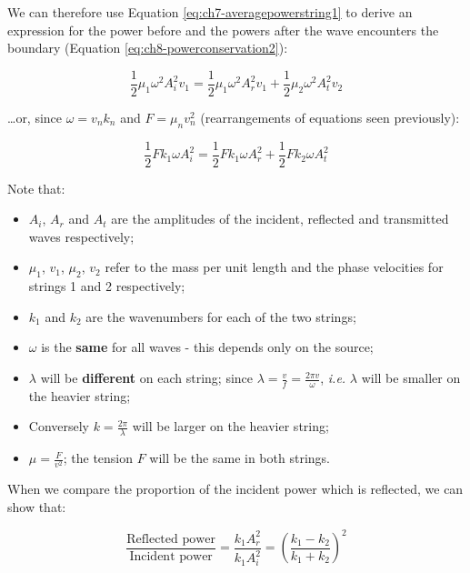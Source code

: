 \documentclass[
]{book}
\providecommand{\tightlist}{%
  \setlength{\itemsep}{0pt}\setlength{\parskip}{0pt}}
\begin{document}
We can therefore use Equation \eqref{eq:ch7-averagepowerstring1} to derive an expression for the power before and the powers after the wave encounters the boundary (Equation \eqref{eq:ch8-powerconservation2}):

\begin{equation}
\frac{1}{2}\mu_1 \omega^2 A_i^2 v_1 = \frac{1}{2}\mu_1 \omega^2 A_r^2 v_1 + \frac{1}{2}\mu_2 \omega^2 A_t^2 v_2
\label{eq:ch8-powerconservation2}
\end{equation}

\ldots or, since \(\omega = v_n k_n\) and \(F = \mu_n v_n^2\) (rearrangements of equations seen previously):

\begin{equation}
\frac{1}{2} F k_1 \omega A_i^2  = \frac{1}{2}F k_1 \omega A_r^2 + \frac{1}{2}F k_2 \omega A_t^2
\label{eq:ch8-powerconservation3}
\end{equation}

Note that:

\begin{itemize}
\tightlist
\item
  \(A_i\), \(A_r\) and \(A_t\) are the amplitudes of the incident, reflected and transmitted waves respectively;
\item
  \(\mu_1\), \(v_1\), \(\mu_2\), \(v_2\) refer to the mass per unit length and the phase velocities for strings 1 and 2 respectively;
\item
  \(k_1\) and \(k_2\) are the wavenumbers for each of the two strings;
\item
  \(\omega\) is the \textbf{same} for all waves - this depends only on the source;
\item
  \(\lambda\) will be \textbf{different} on each string; since \(\lambda = \frac{v}{f} = \frac{2\pi v}{\omega}\), \emph{i.e.} \(\lambda\) will be smaller on the heavier string;
\item
  Conversely \(k = \frac{2\pi}{\lambda}\) will be larger on the heavier string;
\item
  \(\mu = \frac{F}{v^2}\); the tension \(F\) will be the same in both strings.
\end{itemize}

When we compare the proportion of the incident power which is reflected, we can show that:

\begin{equation}
\frac{\textrm{Reflected power}}{\textrm{Incident power}} = \frac{k_1 A_r^2}{k_1 A_i^2} = \left( \frac{k_1 - k_2}{k_1 + k_2} \right)^2
\label{eq:ch8-powerratio1}
\end{equation}
\end{document}
